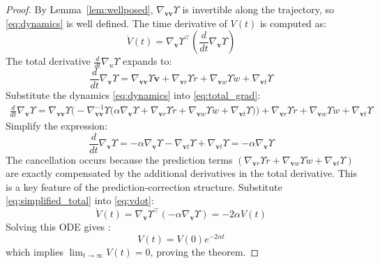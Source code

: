 \documentclass[pdflatex,sn-mathphys,Numbered]{sn-jnl}
\theoremstyle{thmstyleone}
\theoremstyle{thmstyletwo}
\theoremstyle{thmstylethree}
\begin{document}
\begin{proof}
By Lemma~\ref{lem:wellposed}, $\nabla_{\bm{vv}}\Upsilon$ is invertible along the trajectory, so \eqref{eq:dynamics} is well defined. The time derivative of $V(t)$ is computed as:
\begin{equation}
\dot{V}(t) = \nabla_{\bm{v}} \Upsilon^\top \left( \frac{d}{dt} \nabla_{\bm{v}} \Upsilon \right)
\label{eq:vdot}
\end{equation}
The total derivative $\frac{d}{dt}\nabla_u\Upsilon$ expands to:
\begin{equation}
\frac{d}{dt} \nabla_{\bm{v}} \Upsilon = \nabla_{\bm{v}\bm{v}} \Upsilon  \dot{\bm{v}} + \nabla_{\bm{v} r} \Upsilon \dot{r} + \nabla_{\bm{v} w} \Upsilon  \dot{w} + \nabla_{\bm{v} t} \Upsilon
\label{eq:total_grad}
\end{equation}
Substitute the dynamics \eqref{eq:dynamics} into \eqref{eq:total_grad}:
\begin{equation}
\begin{aligned}
\frac{d}{dt} \nabla_{\bm{v}} \Upsilon = \nabla_{\bm{v}\bm{v}} \Upsilon \bigg( -\nabla_{\bm{v}\bm{v}}^{-1} \Upsilon \big( \alpha \nabla_{\bm{v}} \Upsilon + \nabla_{\bm{v} r} \Upsilon \dot{r}+\nabla_{\bm{v} w} \Upsilon \dot{w}  + \nabla_{\bm{v} t} \Upsilon \big) \bigg) + \nabla_{\bm{v} r} \Upsilon \dot{r} + \nabla_{\bm{v} w} \Upsilon \dot{w} + \nabla_{\bm{v} t} \Upsilon
\end{aligned}
\end{equation}
Simplify the expression:
\begin{equation}
\frac{d}{dt} \nabla_{\bm{v}} \Upsilon = -\alpha \nabla_{\bm{v}} \Upsilon - \nabla_{\bm{v} t} \Upsilon + \nabla_{\bm{v} t} \Upsilon = -\alpha \nabla_{\bm{v}} \Upsilon
\label{eq:simplified_total}
\end{equation}
The cancellation occurs because the prediction terms $(\nabla_{\bm{v}r}\Upsilon\dot{r}+\nabla_{\bm{v}w}\Upsilon\dot{w}+\nabla_{\bm{v}t}\Upsilon)$ are exactly compensated by the additional derivatives in the total derivative. This is a key feature of the prediction-correction structure. Substitute \eqref{eq:simplified_total} into \eqref{eq:vdot}:
\begin{equation}
\dot{V}(t) = \nabla_{\bm{v}} \Upsilon^\top \left( -\alpha \nabla_{\bm{v}} \Upsilon \right) = -2\alpha V(t)
\label{eq:vdot_ideal}
\end{equation}
Solving this ODE gives \cite{book12}:
\begin{equation}
V(t) = V(0) e^{-2\alpha t}
\label{eq:exp_decay}
\end{equation}
which implies $\lim_{t\to\infty}V(t)=0$, proving the theorem.
\end{proof}
\end{document}
